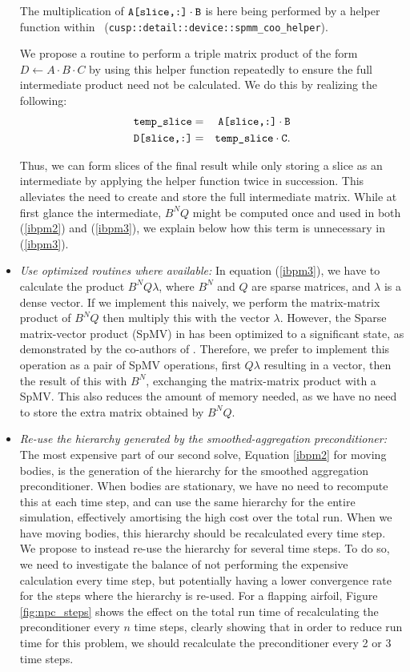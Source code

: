 \begin{itemize}
\noindent
The multiplication of $\verb|A[slice,:]|\cdot \verb|B|$ is here being performed by a helper function within \cusp\ (\verb|cusp::detail::device::spmm_coo_helper|).

We propose a routine to perform a triple matrix product of the form $D \gets A\cdot B\cdot C$ by using this helper function repeatedly to ensure the full intermediate product need not be calculated. We do this by realizing the following:
\begin{eqnarray*}
	\verb|temp_slice| & = & \verb|A[slice,:]|\cdot \verb|B| \\
	\verb|D[slice,:]| & = & \verb|temp_slice|\cdot \verb|C|.
\end{eqnarray*}

Thus, we can form slices of the final result while only storing a slice as an intermediate by applying the helper function twice in succession. This alleviates the need to create and store the full intermediate matrix. While at first glance the intermediate, $B^{N}Q$ might be computed once and used in both (\ref{ibpm2}) and (\ref{ibpm3}), we explain below how this term is unnecessary in (\ref{ibpm3}).

\item \emph{Use optimized routines where available: } In equation (\ref{ibpm3}), we have to calculate the product $B^{N}Q\lambda$, where $B^{N}$ and $Q$ are sparse matrices, and $\lambda$ is a dense vector. If we implement this naively, we perform the matrix-matrix product of $B^{N}Q$ then multiply this with the vector $\lambda$. However, the Sparse matrix-vector product (SpMV) in {\cusp} has been optimized to a significant state, as demonstrated by the co-authors of {\cusp}\cite{BellGarland2009}. Therefore, we prefer to implement this operation as a pair of SpMV operations, first $Q\lambda$ resulting in a vector, then the result of this with $B^{N}$, exchanging the matrix-matrix product with a SpMV. This also reduces the amount of memory needed, as we have no need to store the extra matrix obtained by $B^{N}Q$.

\item \emph{Re-use the hierarchy generated by the smoothed-aggregation preconditioner: } The most expensive part of our second solve, Equation \eqref{ibpm2} for moving bodies, is the generation of the hierarchy for the smoothed aggregation preconditioner. When bodies are stationary, we have no need to recompute this at each time step, and can use the same hierarchy for the entire simulation, effectively amortising the high cost over the total run. When we have moving bodies, this hierarchy should be recalculated every time step. We propose to instead re-use the hierarchy for several time steps. To do so, we need to investigate the balance of not performing the expensive calculation every time step, but potentially having a lower convergence rate for the steps where the hierarchy is re-used. For a flapping airfoil, Figure \ref{fig:npc_steps} shows the effect on the total run time of recalculating the preconditioner every $n$ time steps, clearly showing that in order to reduce run time for this problem, we should recalculate the preconditioner every 2 or 3 time steps.


\end{itemize}

